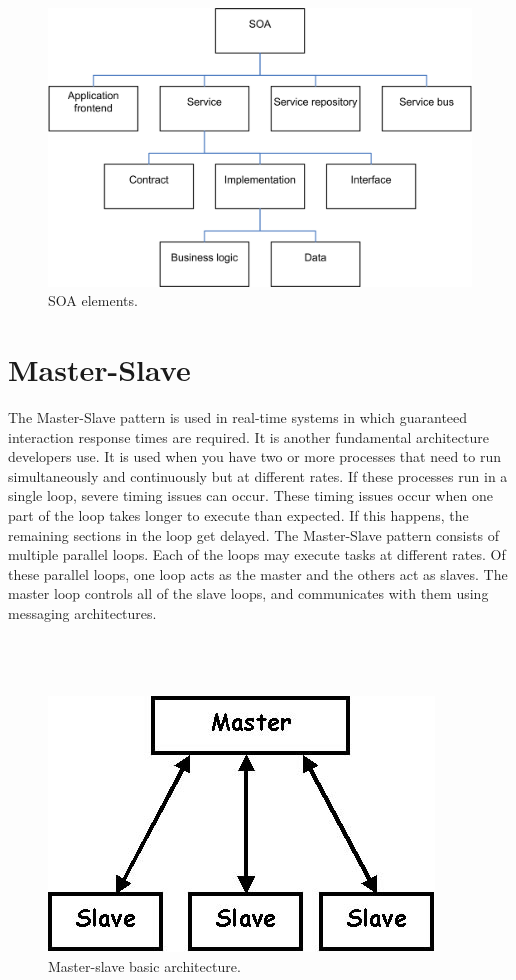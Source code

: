 \documentclass{article}
\begin{document}
\begin{figure}[h]
\centering
\includegraphics[scale=1]{soa.png}
\caption{SOA elements.}
\label{fig_soa}
\end{figure}
	


\section{Master-Slave}
The Master-Slave pattern is used in real-time systems in which guaranteed interaction response times are required. It is another fundamental architecture developers use. It is used when you have two or more processes that need to run simultaneously and continuously but at different rates. If these processes run in a single loop, severe timing issues can occur. These timing issues occur when one part of the loop takes longer to execute than expected. If this happens, the remaining sections in the loop get delayed. The Master-Slave pattern consists of multiple parallel loops. Each of the loops may execute tasks at different rates. Of these parallel loops, one loop acts as the master and the others act as slaves. The master loop controls all of the slave loops, and communicates with them using messaging architectures. \\\\\\\\


\begin{figure}[h]
\centering
\includegraphics[scale=0.7]{ms.jpg}
\caption{Master-slave basic architecture.}
\label{fig_ms}
\end{figure}
\newpage
\end{document}
